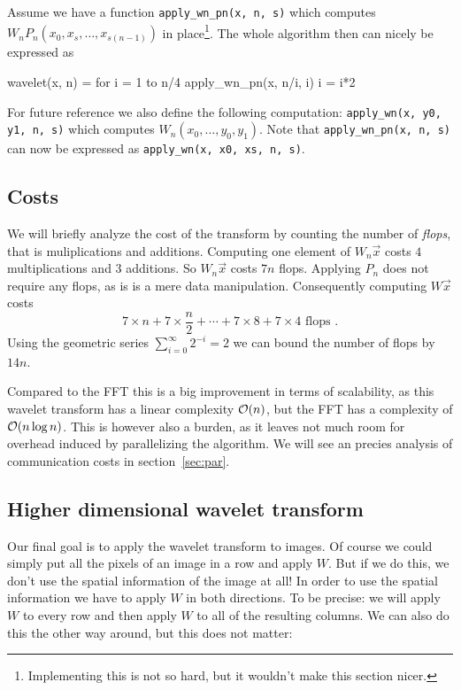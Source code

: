 Assume we have a function \texttt{apply\_wn\_pn(x, n, s)} which computes $W_n P_n (x_0, x_s, \ldots, x_{s(n-1)})$ in place\footnote{Implementing this is not so hard, but it wouldn't make this section nicer.}. The whole algorithm then can nicely be expressed as

\begin{lstlistings}
wavelet(x, n) =
	for i = 1 to n/4
		apply\_wn\_pn(x, n/i, i)
		i = i*2
\end{lstlistings}

For future reference we also define the following computation: \texttt{apply\_wn(x, y0, y1, n, s)} which computes $W_n (x_0, \ldots, y_0, y_1)$. Note that \texttt{apply\_wn\_pn(x, n, s)} can now be expressed as \texttt{apply\_wn(x, x0, xs, n, s)}.


\subsection{Costs}
We will briefly analyze the cost of the transform by counting the number of \emph{flops}, that is muliplications and additions. Computing one element of $W_n \vec{x}$ costs $4$ multiplications and $3$ additions. So $W_n \vec{x}$ costs $7n$ flops. Applying  $P_n$ does not require any flops, as is is a mere data manipulation. Consequently computing $W \vec{x}$ costs
\[ 7 \times n + 7 \times \frac{n}{2} + \cdots +  7 \times 8 + 7 \times 4 \text{ flops }. \]
Using the geometric series $\sum_{i=0}^\infty 2^{-i} = 2$ we can bound the number of flops by $14n$.

Compared to the FFT this is a big improvement in terms of scalability, as this wavelet transform has a linear complexity $\mathcal{O}(n)$, but the FFT has a complexity of $\mathcal{O}(n \log n)$. This is however also a burden, as it leaves not much room for overhead induced by parallelizing the algorithm. We will see an precies analysis of communication costs in section~\ref{sec:par}.


\subsection{Higher dimensional wavelet transform}
Our final goal is to apply the wavelet transform to images. Of course we could simply put all the pixels of an image in a row and apply $W$. But if we do this, we don't use the spatial information of the image at all! In order to use the spatial information we have to apply $W$ in both directions. To be precise: we will apply $W$ to every row and then apply $W$ to all of the resulting columns. We can also do this the other way around, but this does not matter:

